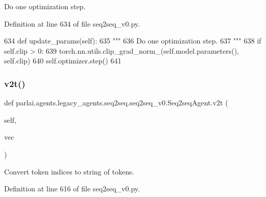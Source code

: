 \begin{DoxyVerb}Do one optimization step.
\end{DoxyVerb}
 

Definition at line 634 of file seq2seq\+\_\+v0.\+py.


\begin{DoxyCode}
634     \textcolor{keyword}{def }update\_params(self):
635         \textcolor{stringliteral}{"""}
636 \textcolor{stringliteral}{        Do one optimization step.}
637 \textcolor{stringliteral}{        """}
638         \textcolor{keywordflow}{if} self.clip > 0:
639             torch.nn.utils.clip\_grad\_norm\_(self.model.parameters(), self.clip)
640         self.optimizer.step()
641 
\end{DoxyCode}
\mbox{\label{classparlai_1_1agents_1_1legacy__agents_1_1seq2seq_1_1seq2seq__v0_1_1Seq2seqAgent_a8f6de929b475d3915c159c48165b4575}} 
\subsubsection{\texorpdfstring{v2t()}{v2t()}}
{\footnotesize\ttfamily def parlai.\+agents.\+legacy\+\_\+agents.\+seq2seq.\+seq2seq\+\_\+v0.\+Seq2seq\+Agent.\+v2t (\begin{DoxyParamCaption}\item[{}]{self,  }\item[{}]{vec }\end{DoxyParamCaption})}

\begin{DoxyVerb}Convert token indices to string of tokens.
\end{DoxyVerb}
 

Definition at line 616 of file seq2seq\+\_\+v0.\+py.


